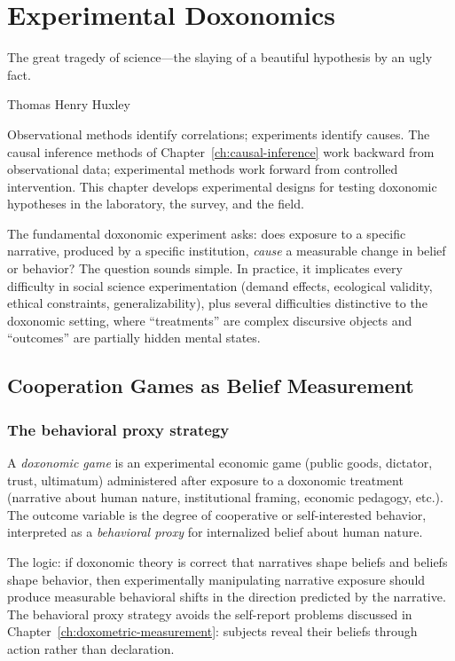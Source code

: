 \chapter{Experimental Doxonomics}
\label{ch:experimental}

\epigraph{The great tragedy of science---the slaying of a beautiful hypothesis by an ugly fact.}{Thomas Henry Huxley}

\noindent
Observational methods identify correlations; experiments identify causes.
The causal inference methods of Chapter~\ref{ch:causal-inference} work backward from observational data; experimental methods work forward from controlled intervention.
This chapter develops experimental designs for testing doxonomic hypotheses in the laboratory, the survey, and the field.

The fundamental doxonomic experiment asks: does exposure to a specific narrative, produced by a specific institution, \emph{cause} a measurable change in belief or behavior?
The question sounds simple.
In practice, it implicates every difficulty in social science experimentation (demand effects, ecological validity, ethical constraints, generalizability), plus several difficulties distinctive to the doxonomic setting, where ``treatments'' are complex discursive objects and ``outcomes'' are partially hidden mental states.

\section{Cooperation Games as Belief Measurement}
\label{sec:ch19-games}

\subsection{The behavioral proxy strategy}

\begin{definition}
\label{def:doxonomic-game}
A \emph{doxonomic game} is an experimental economic game (public goods, dictator, trust, ultimatum) administered after exposure to a doxonomic treatment (narrative about human nature, institutional framing, economic pedagogy, etc.).
The outcome variable is the degree of cooperative or self-interested behavior, interpreted as a \emph{behavioral proxy} for internalized belief about human nature.
\end{definition}

The logic: if doxonomic theory is correct that narratives shape beliefs and beliefs shape behavior, then experimentally manipulating narrative exposure should produce measurable behavioral shifts in the direction predicted by the narrative.
The behavioral proxy strategy avoids the self-report problems discussed in Chapter~\ref{ch:doxometric-measurement}: subjects reveal their beliefs through action rather than declaration.

